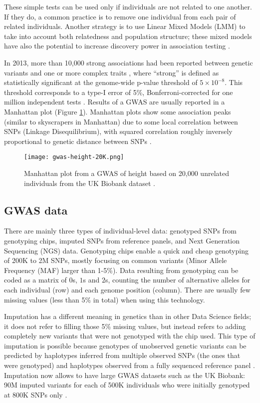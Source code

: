 These simple tests can be used only if individuals are not related to one another. If they do, a common practice is to remove one individual from each pair of related individuals. Another strategy is to use Linear Mixed Models (LMM) to take into account both relatedness and population structure; these mixed models have also the potential to increase discovery power in association testing \cite[]{yang2014advantages}.

In 2013, more than 10,000 strong associations had been reported between genetic variants and one or more complex traits \cite[]{welter2013nhgri}, where ``strong'' is defined as statistically significant at the genome-wide p-value threshold of $5 \times 10^{-8}$. This threshold corresponds to a type-I error of 5\%, Bonferroni-corrected for one million independent tests \cite[]{pe2008estimation}. Results of a GWAS are usually reported in a Manhattan plot (Figure \ref{fig:gwas}). 
Manhattan plots show some association peaks (similar to skyscrapers in Manhattan) due to some local correlation between SNPs (Linkage Disequilibrium), with squared correlation roughly inversely proportional to genetic distance between SNPs \cite[]{hudson2001two}.

\begin{figure}[htb]
\centerline{\texttt{[image: gwas-height-20K.png]}}
\caption{Manhattan plot from a GWAS of height based on 20,000 unrelated individuals from the UK Biobank dataset \cite[]{bycroft2017genome}.}\label{fig:gwas}
\end{figure}


\subsection{GWAS data}

There are mainly three types of individual-level data: genotyped SNPs from genotyping chips, imputed SNPs from reference panels, and Next Generation Sequencing (NGS) data.
Genotyping chips enable a quick and cheap genotyping of 200K to 2M SNPs, mostly focusing on common variants (Minor Allele Frequency (MAF) larger than 1-5\%). 
Data resulting from genotyping can be coded as a matrix of $0$s, $1$s and $2$s, counting the number of alternative alleles for each individual (row) and each genome position (column). There are usually few missing values (less than 5\% in total) when using this technology.

Imputation has a different meaning in genetics than in other Data Science fields; it does not refer to filling those 5\% missing values, but instead refers to adding completely new variants that were not genotyped with the chip used. 
This type of imputation is possible because genotypes of unobserved genetic variants can be predicted by haplotypes inferred from multiple observed SNPs (the ones that were genotyped) and haplotypes observed from a fully sequenced reference panel \cite[]{marchini2010genotype,mccarthy2016reference}.
Imputation now allows to have large GWAS datasets such as the UK Biobank: 90M imputed variants for each of 500K individuals who were initially genotyped at 800K SNPs only \cite[]{bycroft2017genome}.

